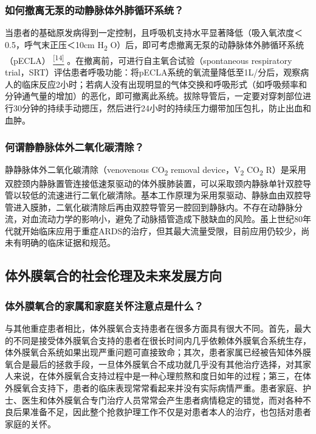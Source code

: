 \subsubsection{如何撤离无泵的动静脉体外肺循环系统？}

当患者的基础原发病得到一定控制，且呼吸机支持水平显著降低（吸入氧浓度＜0.5，呼气末正压＜10cm
H\textsubscript{2}
O）后，即可考虑撤离无泵的动静脉体外肺循环系统（pECLA）
\protect\hyperlink{text00030.htmlux5cux23ch14-29}{\textsuperscript{{[}14{]}}}
。在撤离前，可进行自主氧合试验（spontaneous respiratory
trial，SRT）评估患者呼吸功能：将pECLA系统的氧流量降低至1L/分后，观察病人的临床反应2小时；若病人没有出现明显的气体交换和呼吸形式（如呼吸频率和分钟通气量的增加）的恶化，即可撤离此系统。拔除导管后，一定要对穿刺部位进行30分钟的持续手动摁压，然后进行24小时的持续压力绷带加压包扎，防止出血和血肿。

\subsubsection{何谓静静脉体外二氧化碳清除？}

静静脉体外二氧化碳清除（venovenous CO\textsubscript{2} removal
device，V\textsubscript{2} CO\textsubscript{2}
R）是采用双腔颈内静脉置管连接低速泵驱动的体外膜肺装置，可以采取颈内静脉单针双腔导管以较低的流速进行二氧化碳清除。基本工作原理为采用泵驱动、静脉血由双腔导管进入膜肺，二氧化碳清除后再由双腔导管另一腔回到静脉内。不存在动静脉分流，对血流动力学的影响小，避免了动脉插管造成下肢缺血的风险。虽上世纪80年代就开始临床应用于重症ARDS的治疗，但其最大流量受限，目前应用仍较少，尚未有明确的临床证据和规范。

\subsection{体外膜氧合的社会伦理及未来发展方向}

\subsubsection{体外膜氧合的家属和家庭关怀注意点是什么？}

与其他重症患者相比，体外膜氧合支持患者在很多方面具有很大不同。首先，最大的不同是接受体外膜氧合支持的患者在很长时间内几乎依赖体外膜氧合系统生存，体外膜氧合系统如果出现严重问题可直接致命；其次，患者家属已经被告知体外膜氧合是最后的拯救手段，一旦体外膜氧合不成功就几乎没有其他治疗选择，对其家人来说，在体外膜氧合支持过程中是一种心理煎熬和度日如年的过程；第三，在体外膜氧合支持下，患者的临床表现常常看起来并没有实际病情严重。患者家庭、护士、医生和体外膜氧合专门治疗人员常常会产生患者病情稳定的错觉，而对各种不良后果准备不足，因此整个抢救护理工作不仅是对患者本人的治疗，也包括对患者家庭的关怀。

